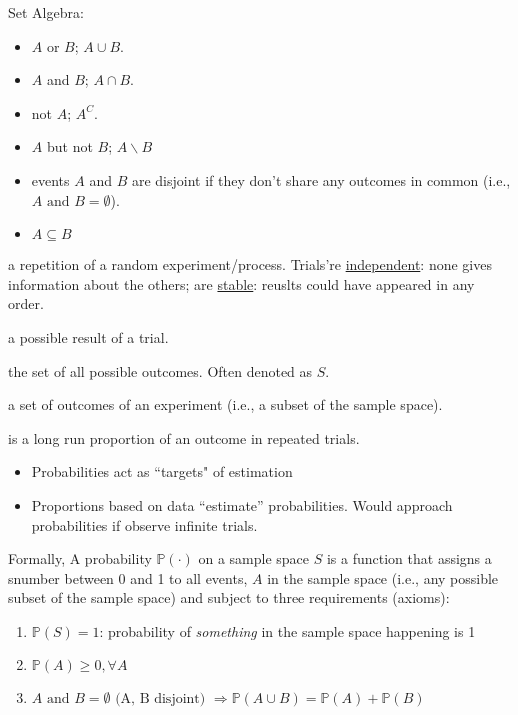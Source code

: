 \documentclass[10pt,landscape]{article}
\newcommand{\Blue}[1]{\noindent{\textbf{\textcolor{Blue}{#1 -}}}}
\newcommand{\Red}[1]{\noindent{\textbf{\textcolor{BrickRed}{#1 -}}}}
\begin{document}
\raggedright
\footnotesize
\begin{multicols}{4}


\setlength{\premulticols}{1pt}
\setlength{\postmulticols}{1pt}
\setlength{\multicolsep}{1pt}
\setlength{\columnsep}{2pt}

Set Algebra:
\begin{itemize}
    \item \Blue{Union} $A$ or $B$; $A \cup B$.
    \item \Blue{Intersection} $A$ and $B$; $A \cap B$.
    \item \Blue{Complement} not $A$; $A^C$.
    \item \Blue{Difference} $A$ but not $B$; $A \backslash B$
    \item \Blue{Disjoint Events aka. mutually exclusive} events $A$ and $B$ are disjoint if they don't share any
        outcomes in common (i.e., $A \text{ and } B = \emptyset$).
    \item \Blue{Subset} $A \subseteq B$
\end{itemize}

\Blue{Trial} a repetition of a random experiment/process. Trials're \underline{independent}: none gives information about the
others; are \underline{stable}: reuslts could have appeared in any order.

\Blue{Outcome} a possible result of a trial.

\Blue{Sample space} the set of all possible outcomes. Often denoted as $S$.

\Blue{Event} a set of outcomes of an experiment (i.e., a subset of the sample space).

\Red{Probability} is a long run proportion of an outcome in repeated trials.
\begin{itemize}
    \item Probabilities act as ``targets" of estimation
    \item Proportions based on data ``estimate'' probabilities. Would approach probabilities if observe infinite trials.
\end{itemize}
Formally, 
A probability $\mathbb{P}(\cdot)$ on a sample space $S$ is a function that assigns a snumber between 0 and 1 to all
events, $A$ in the sample space (i.e., any possible subset of the sample space) and subject to three requirements
(axioms):
\begin{enumerate}
    \item $\mathbb{P}(S) = 1$: probability of \textit{something} in the sample space happening is 1
    \item $\mathbb{P}(A) \ge 0, \forall A$
    \item $A \text{ and } B = \emptyset \text{ (A, B disjoint) } \Rightarrow \mathbb{P}(A \cup B) = \mathbb{P}(A) + \mathbb{P}(B)$
\end{enumerate}


\end{multicols}
\end{document}
